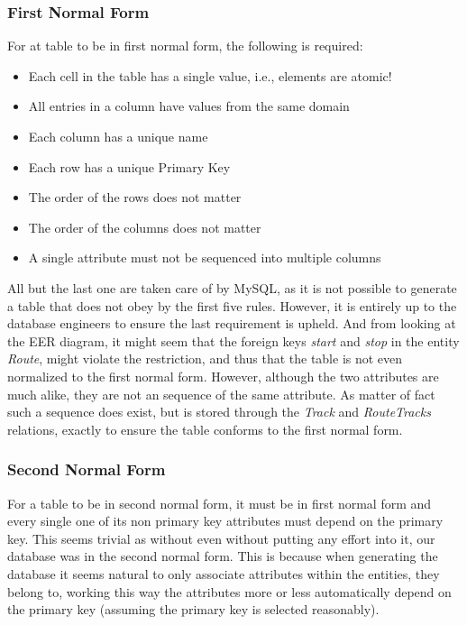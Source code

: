 \subsubsection{First Normal Form}
For at table to be in first normal form, the following is required:
\begin{itemize}
    \item Each cell in the table has a single value, i.e., elements are atomic!
    \item All entries in a column have values from the same domain
    \item Each column has a unique name
    \item Each row has a unique Primary Key
    \item The order of the rows does not matter
    \item The order of the columns does not matter
    \item A single attribute must not be sequenced into multiple columns
\end{itemize}
All but the last one are taken care of by MySQL, as it is not possible to 
generate a table that does not obey by the first five rules. However, it is 
entirely up to the database engineers to ensure the last requirement is upheld. 
And from looking at the EER diagram, it might seem that the foreign keys 
\emph{start} and \emph{stop} in the entity \emph{Route}, might violate the 
restriction, and thus that the table is not even normalized to the first normal 
form. However, although the two attributes are much alike, they are not an 
sequence of the same attribute. As matter of fact such a sequence does exist, 
but is stored through the \emph{Track} and \emph{RouteTracks} relations, exactly to ensure the table conforms to the first normal 
form. 

\subsubsection{Second Normal Form}
For a table to be in second normal form, it must be in first normal form and 
every single one of its non primary key attributes must depend on the primary 
key. This seems trivial as without even without putting any effort into it, our 
database was in the second normal form. This is because when generating the 
database it seems natural to only associate attributes within the entities, 
they belong to, working this way the attributes more or less automatically 
depend on the primary key (assuming the primary key is selected reasonably). 

